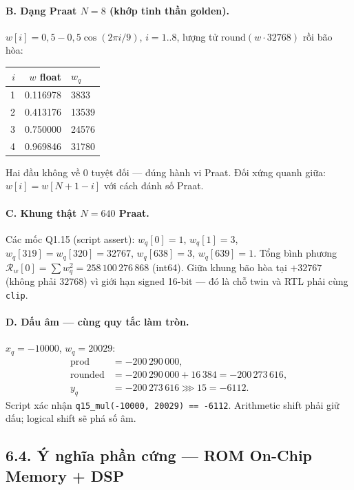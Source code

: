 \paragraph{B. Dạng Praat $N=8$ (khớp tinh thần golden).}
$w[i] = 0{,}5 - 0{,}5\cos(2\pi i/9)$, $i = 1..8$, lượng tử $\mathrm{round}(w\cdot 32768)$ rồi bão hòa:
\begin{center}\small
\begin{tabular}{@{}rrl@{}}\toprule
$i$ & $w$ float & $w_q$ \\
\midrule
1 & 0.116978 & 3833 \\
2 & 0.413176 & 13539 \\
3 & 0.750000 & 24576 \\
4 & 0.969846 & 31780 \\
\bottomrule
\end{tabular}
\end{center}
Hai đầu không về 0 tuyệt đối --- đúng hành vi Praat. Đối xứng quanh giữa: $w[i]=w[N+1-i]$ với cách đánh số Praat.

\paragraph{C. Khung thật $N=640$ Praat.}
Các mốc Q1.15 (script assert): $w_q[0] = 1$, $w_q[1] = 3$, $w_q[319] = w_q[320] = 32767$, $w_q[638] = 3$, $w_q[639] = 1$. Tổng bình phương $\mathcal{R}_w[0] = \sum w_q^2 = 258\,100\,276\,868$ (int64). Giữa khung bão hòa tại $+32767$ (không phải $32768$) vì giới hạn signed 16-bit --- đó là chỗ twin và RTL phải cùng \texttt{clip}.

\paragraph{D. Dấu âm --- cùng quy tắc làm tròn.}
$x_q = -10000$, $w_q = 20029$:
\begin{align*}
\mathrm{prod} &= -200\,290\,000,\\
\mathrm{rounded} &= -200\,290\,000 + 16\,384 = -200\,273\,616,\\
y_q &= -200\,273\,616 \ggg 15 = -6112.
\end{align*}
Script xác nhận \texttt{q15\_mul(-10000, 20029) == -6112}. Arithmetic shift phải giữ dấu; logical shift sẽ phá số âm.

\subsection*{6.4. Ý nghĩa phần cứng --- ROM On-Chip Memory + DSP}

